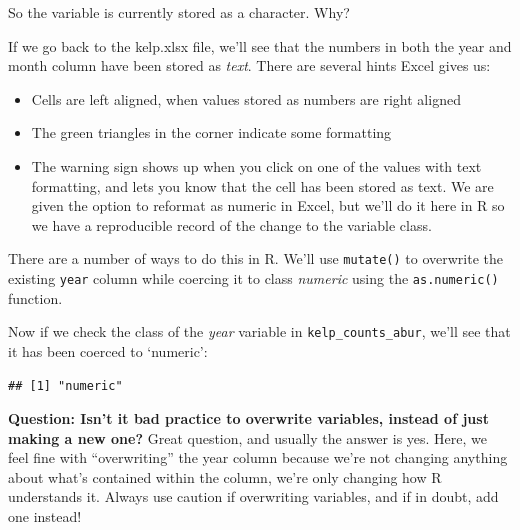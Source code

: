\documentclass[]{book}
\newenvironment{Shaded}{\begin{snugshade}}{\end{snugshade}}
\newcommand{\CommentTok}[1]{\textcolor[rgb]{0.56,0.35,0.01}{\textit{#1}}}
\newcommand{\DataTypeTok}[1]{\textcolor[rgb]{0.13,0.29,0.53}{#1}}
\newcommand{\KeywordTok}[1]{\textcolor[rgb]{0.13,0.29,0.53}{\textbf{#1}}}
\newcommand{\NormalTok}[1]{#1}
\newcommand{\OperatorTok}[1]{\textcolor[rgb]{0.81,0.36,0.00}{\textbf{#1}}}
\newcommand{\StringTok}[1]{\textcolor[rgb]{0.31,0.60,0.02}{#1}}
\providecommand{\tightlist}{%
  \setlength{\itemsep}{0pt}\setlength{\parskip}{0pt}}
\begin{document}
So the variable is currently stored as a character. Why?

If we go back to the kelp.xlsx file, we'll see that the numbers in both the year and month column have been stored as \emph{text}. There are several hints Excel gives us:

\begin{itemize}
\tightlist
\item
  Cells are left aligned, when values stored as numbers are right aligned
\item
  The green triangles in the corner indicate some formatting
\item
  The warning sign shows up when you click on one of the values with text formatting, and lets you know that the cell has been stored as text. We are given the option to reformat as numeric in Excel, but we'll do it here in R so we have a reproducible record of the change to the variable class.
\end{itemize}

There are a number of ways to do this in R. We'll use \texttt{mutate()} to overwrite the existing \texttt{year} column while coercing it to class \emph{numeric} using the \texttt{as.numeric()} function.

\begin{Shaded}
\end{Shaded}

Now if we check the class of the \emph{year} variable in \texttt{kelp\_counts\_abur}, we'll see that it has been coerced to `numeric':

\begin{Shaded}
\end{Shaded}

\begin{verbatim}
## [1] "numeric"
\end{verbatim}

\textbf{Question: Isn't it bad practice to overwrite variables, instead of just making a new one?} Great question, and usually the answer is yes. Here, we feel fine with ``overwriting'' the year column because we're not changing anything about what's contained within the column, we're only changing how R understands it. Always use caution if overwriting variables, and if in doubt, add one instead!
\end{document}
